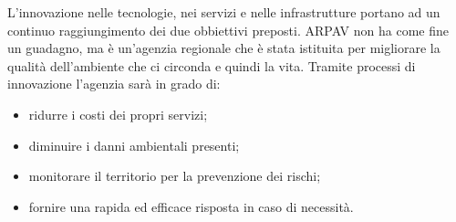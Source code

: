 L'innovazione nelle tecnologie, nei servizi e nelle infrastrutture portano ad un continuo raggiungimento dei due obbiettivi preposti. ARPAV non ha come fine un guadagno, ma è un'agenzia regionale che è stata istituita per migliorare la qualità dell'ambiente che ci circonda e quindi la vita. Tramite processi di innovazione l'agenzia sarà in grado di: 
\begin{itemize}
	\item ridurre i costi dei propri servizi;
	\item diminuire i danni ambientali presenti;
	\item monitorare il territorio per la prevenzione dei rischi;
	\item fornire una rapida ed efficace risposta in caso di necessità.
	
\end{itemize}

